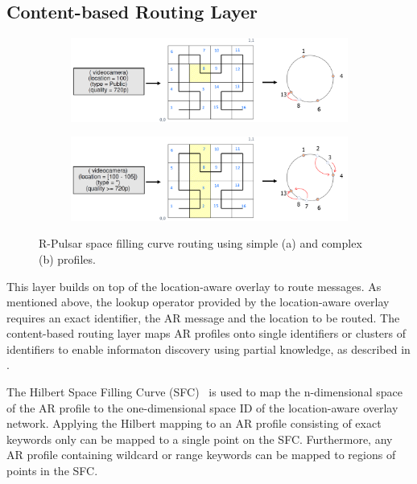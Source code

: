 \subsection{Content-based Routing Layer}\label{sec:frameworkc}

\begin{figure}
\centering
\begin{subfigure}[b]{0.9\textwidth}
   \includegraphics[width=1\linewidth]{Figures/single.pdf}
   \caption{}
\end{subfigure}
\begin{subfigure}[b]{0.9\textwidth}
   \includegraphics[width=1\linewidth]{Figures/multi.pdf}
   \caption{}
\end{subfigure}
\caption{R-Pulsar space filling curve routing using simple (a) and complex (b) profiles.}\label{fig:routingProfiles} 
\end{figure}

This layer builds on top of the location-aware overlay to route messages. As mentioned above, the lookup operator provided by the location-aware overlay requires an exact identifier, the AR message and the location to be routed. The content-based routing layer maps AR profiles onto single identifiers or clusters of identifiers to enable informaton discovery using partial knowledge, as described in \cite{SCHMIDT2008962}.

The Hilbert Space Filling Curve (SFC)~\cite{SFC} is used to map the n-dimensional space of the AR profile to the one-dimensional space ID of the location-aware overlay network. Applying the Hilbert mapping to an AR profile consisting of exact keywords only can be mapped to a single point on the SFC. Furthermore, any AR profile containing wildcard or range keywords can be mapped to regions of points in the SFC.

